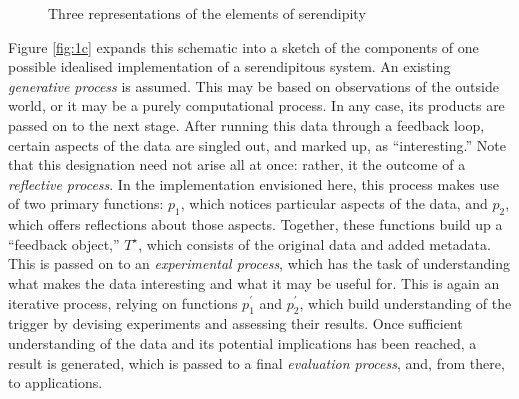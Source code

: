 \afterpage{\clearpage}
\begin{figure}[p]
\begin{minipage}[b]{\textwidth}
{\centering


\par}
\vspace{-4mm}
\label{fig:1a}
\end{minipage}
\medskip

\begin{minipage}[b]{\textwidth}
{\centering

\par}
\label{fig:1b}
\end{minipage}
\medskip

\begin{minipage}[b]{\textwidth}
{\centering


\par}
\smallskip

\label{fig:1c}
\end{minipage}
\bigskip

\caption{Three representations of the elements of serendipity}\label{fig:model}
\end{figure}

Figure \ref{fig:1c} expands this schematic into a sketch of the
components of one possible idealised implementation of a serendipitous
system.  An existing \emph{generative process} is assumed.  This may
be based on observations of the outside world, or it may be a purely
computational process.  In any case, its products are passed on to the
next stage.  After running this data through a feedback loop, certain
aspects of the data are singled out, and marked up, as
``interesting.''  Note that this designation need not arise all at
once: rather, it the outcome of a \emph{reflective process}.  In the
implementation envisioned here, this process makes use of two primary
functions: $p_1$, which notices particular aspects of the data, and $p_2$, which
offers reflections about those aspects.  Together, these functions build up a
``feedback object,'' $T^{\star}$, which consists of the original data
and added metadata.  This is passed on to an \emph{experimental
  process}, which has the task of understanding what makes the data
interesting and what it may be useful for.  This is again an iterative
process, relying on functions $p^{\prime}_1$ and $p^{\prime}_2$, which
build understanding of the trigger by devising experiments and
assessing their results.  Once sufficient understanding of the data
and its potential implications has been reached, a result is
generated, which is passed to a final \emph{evaluation process}, and,
from there, to applications.


